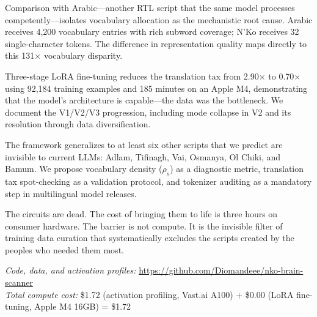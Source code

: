 \documentclass[11pt]{article}
\begin{document}
Comparison with Arabic---another RTL script that the same model processes competently---isolates vocabulary allocation as the mechanistic root cause.
Arabic receives 4,200 vocabulary entries with rich subword coverage; N'Ko receives 32 single-character tokens.
The difference in representation quality maps directly to this 131$\times$ vocabulary disparity.

Three-stage LoRA fine-tuning reduces the translation tax from 2.90$\times$ to 0.70$\times$ using 92,184 training examples and 185 minutes on an Apple M4, demonstrating that the model's architecture is capable---the data was the bottleneck.
We document the V1/V2/V3 progression, including mode collapse in V2 and its resolution through data diversification.

The framework generalizes to at least six other scripts that we predict are invisible to current LLMs: Adlam, Tifinagh, Vai, Osmanya, Ol Chiki, and Bamum.
We propose vocabulary density ($\rho_s$) as a diagnostic metric, translation tax spot-checking as a validation protocol, and tokenizer auditing as a mandatory step in multilingual model releases.

The circuits are dead.
The cost of bringing them to life is three hours on consumer hardware.
The barrier is not compute.
It is the invisible filter of training data curation that systematically excludes the scripts created by the peoples who needed them most.

\vspace{0.5em}
\noindent\textit{Code, data, and activation profiles:} \url{https://github.com/Diomandeee/nko-brain-scanner}\\
\noindent\textit{Total compute cost:} \$1.72 (activation profiling, Vast.ai A100) + \$0.00 (LoRA fine-tuning, Apple M4 16GB) = \$1.72

\end{document}
